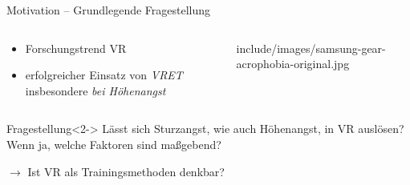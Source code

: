 \begin{frame}{Motivation -- Grundlegende Fragestellung}
\begin{columns}
	\begin{column}{0.48\textwidth}
		\begin{itemize}[label=\textcolor{tertiary}{}]
			\item Forschungstrend \gls{VR}
			\item erfolgreicher Einsatz von \textit{\gls{VRET}} insbesondere \textit{bei Höhenangst} \autocite{Emmelkamp2001}
		\end{itemize}
	\end{column}
	\begin{column}{0.44\textwidth}
		\vfill
		\hfill
		\begin{overpic}[width=0.9\columnwidth]{include/images/samsung-gear-acrophobia-original.jpg}
		\end{overpic}
	\end{column}
\end{columns}
\vfill
{}
\begin{block}{Fragestellung}<2->
	Lässt sich \textcolor{tertiary}{Sturzangst}, wie auch Höhenangst, \textcolor{tertiary}{in \gls{VR} auslösen?}\\Wenn ja, welche Faktoren sind maßgebend?
	
	\hfill $\rightarrow$ Ist \gls{VR} als Trainingsmethoden denkbar?
\end{block}
\end{frame}

